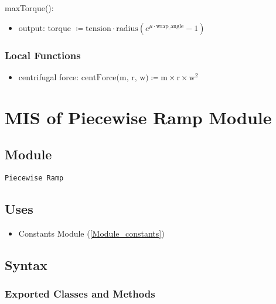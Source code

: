 \documentclass[12pt, titlepage]{article}
\begin{document}
\noindent maxTorque():
\begin{itemize}
  \item output: torque $\coloneq \text{tension} \cdot \text{radius} \left( e^{\mu \cdot \text{wrap\_angle}} - 1 \right) $
\end{itemize}



\subsubsection{Local Functions}
\begin{itemize}
  \item centrifugal force: $\text{centForce(m, r, w)} \coloneq \text{m} \times \text{r} \times \text{w}^2$
\end{itemize}


\newpage


\section{MIS of Piecewise Ramp Module} \label{Module_piecewise_ramp}

\subsection{Module}

\texttt{Piecewise Ramp}

\subsection{Uses}

\begin{itemize}
  \item Constants Module (\ref{Module_constants})
\end{itemize}

\subsection{Syntax}

\subsubsection{Exported Classes and Methods}
\end{document}

